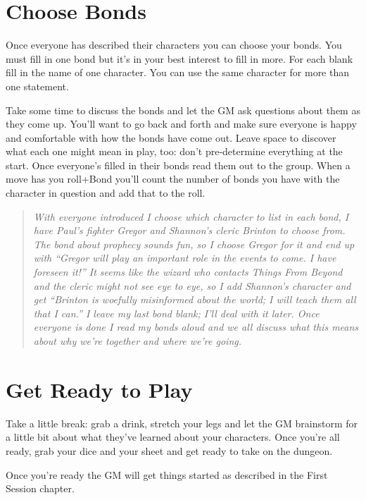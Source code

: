 \section{Choose Bonds}


 Once everyone has described their characters you can choose your bonds. You must fill in one bond but it's in your best interest to fill in more. For each blank fill in the name of one character. You can use the same character for more than one statement.


 Take some time to discuss the bonds and let the GM ask questions about them as they come up. You'll want to go back and forth and make sure everyone is happy and comfortable with how the bonds have come out. Leave space to discover what each one might mean in play, too: don't pre-determine everything at the start. Once everyone's filled in their bonds read them out to the group. When a move has you roll+Bond you'll count the number of bonds you have with the character in question and add that to the roll.


\begin{quote}
\emph{With everyone introduced I choose which character to list in each bond, I have Paul's fighter Gregor and Shannon's cleric Brinton to choose from. The bond about prophecy sounds fun, so I choose Gregor for it and end up with ``Gregor will play an important role in the events to come. I have foreseen it!'' It seems like the wizard who contacts Things From Beyond and the cleric might not see eye to eye, so I add Shannon's character and get ``Brinton is woefully misinformed about the world; I will teach them all that I can.'' I leave my last bond blank; I'll deal with it later. Once everyone is done I read my bonds aloud and we all discuss what this means about why we're together and where we're going.}
\end{quote}
\section{Get Ready to Play}


 Take a little break: grab a drink, stretch your legs and let the GM brainstorm for a little bit about what they've learned about your characters. Once you're all ready, grab your dice and your sheet and get ready to take on the dungeon.


 Once you're ready the GM will get things started as described in the First Session chapter.


